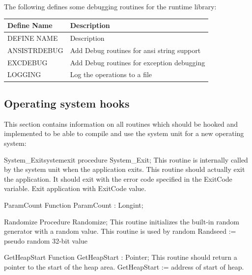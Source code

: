 \documentclass [12pt]{article}
\begin{document}
The following defines some debugging routines for the runtime library:

\begin{longtable}{|l|p{10cm}|}
\hline
Define Name & Description \\
\hline
\endhead
\hline
\endfoot
DEFINE NAME     & Description \\
ANSISTRDEBUG    & Add Debug routines for ansi string support \\
EXCDEBUG        & Add Debug routines for exception debugging \\
LOGGING         & Log the operations to a file \\
\end{longtable}

\subsection{Operating system hooks}
\label{subsec:operating}

This section contains information on all routines which should be hooked and 
implemented to be able to compile and use the system unit for a new 
operating system:

\begin{functionl}{System{\_}Exit}{systemexit}
\Declaration
procedure System{\_}Exit;
\Description 
This routine is internally called by the system unit when the application
exits.
\Notes 
This routine should actually exit the application. It should exit with the
error code specified in the \textsf{ExitCode} variable.
\Algorithm 
Exit application with ExitCode value.
\end{functionl}

\begin{function}{ParamCount}
\Declaration
Function ParamCount : Longint;
\end{function}

\begin{procedure}{Randomize}
\Declaration
Procedure Randomize;
\Description 
This routine initializes the built-in random generator with a random value. 
\Notes 
This routine is used by random 
\Algorithm
Randseed := pseudo random 32-bit value
\end{procedure}

\begin{function}{GetHeapStart}
\Declaration
Function GetHeapStart : Pointer;
\Description 
This routine should return a pointer to the start of the heap area. 
\Notes 
GetHeapStart := address of start of heap.
\end{function}
\end{document}
